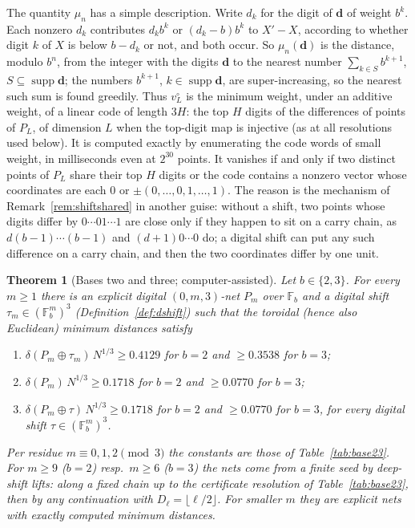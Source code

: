 \documentclass[11pt]{amsart}
\newtheorem{theorem}{Theorem}
\theoremstyle{definition}
\theoremstyle{plain}
\newcommand{\F}{\mathbb{F}}
\begin{document}
The quantity $\mu_n$ has a simple description. Write $d_k$ for the digit of $\mathbf d$ of weight $b^k$. Each nonzero $d_k$ contributes $d_kb^k$ or $(d_k-b)b^k$ to $X'-X$, according to whether digit $k$ of $X$ is below $b-d_k$ or not, and both occur. So $\mu_n(\mathbf d)$ is the distance, modulo $b^n$, from the integer with the digits $\mathbf d$ to the nearest number $\sum_{k\in S}b^{k+1}$, $S\subseteq\operatorname{supp}\mathbf d$; the numbers $b^{k+1}$, $k\in\operatorname{supp}\mathbf d$, are super-increasing, so the nearest such sum is found greedily. Thus $v^\circ_L$ is the minimum weight, under an additive weight, of a linear code of length $3H$: the top $H$ digits of the differences of points of $P_L$, of dimension $L$ when the top-digit map is injective (as at all resolutions used below). It is computed exactly by enumerating the code words of small weight, in milliseconds even at $2^{30}$ points. It vanishes if and only if two distinct points of $P_L$ share their top $H$ digits or the code contains a nonzero vector whose coordinates are each $0$ or $\pm(0,\dots,0,1,\dots,1)$. The reason is the mechanism of Remark~\ref{rem:shiftshared} in another guise: without a shift, two points whose digits differ by $0\cdots01\cdots1$ are close only if they happen to sit on a carry chain, as $d(b-1)\cdots(b-1)$ and $(d+1)0\cdots0$ do; a digital shift can put any such difference on a carry chain, and then the two coordinates differ by one unit.

\begin{theorem}[Bases two and three; computer-assisted]\label{thm:base23}
Let $b\in\{2,3\}$. For every $m\ge1$ there is an explicit digital $(0,m,3)$-net $P_m$ over $\F_b$ and a digital shift $\tau_m\in(\F_b^m)^3$ (Definition~\ref{def:dshift}) such that the toroidal (hence also Euclidean) minimum distances satisfy
\begin{enumerate}
\item $\delta(P_m\oplus\tau_m)\,N^{1/3}\ge0.4129$ for $b=2$ and $\ge0.3538$ for $b=3$;
\item $\delta(P_m)\,N^{1/3}\ge0.1718$ for $b=2$ and $\ge0.0770$ for $b=3$;
\item $\delta(P_m\oplus\tau)\,N^{1/3}\ge0.1718$ for $b=2$ and $\ge0.0770$ for $b=3$, for every digital shift $\tau\in(\F_b^m)^3$.
\end{enumerate}
Per residue $m\equiv0,1,2\pmod3$ the constants are those of Table~\ref{tab:base23}. For $m\ge9$ ($b=2$) resp.\ $m\ge6$ ($b=3$) the nets come from a finite seed by deep-shift lifts: along a fixed chain up to the certificate resolution of Table~\ref{tab:base23}, then by any continuation with $D_\ell=\lfloor\ell/2\rfloor$. For smaller $m$ they are explicit nets with exactly computed minimum distances.
\end{theorem}
\end{document}
